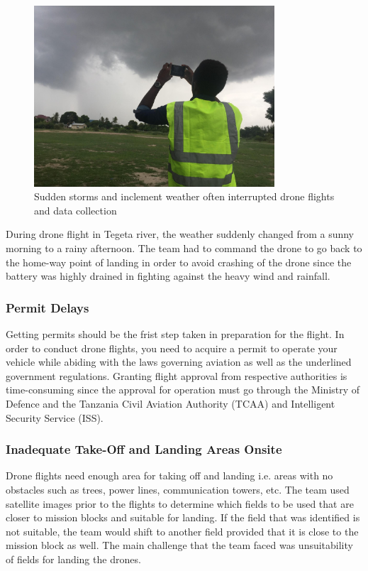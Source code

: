 \documentclass[a4paper,12pt,twoside]{article}
\begin{document}
        \begin{figure} %
            \centering
            \includegraphics[width=0.8\textwidth]{images/image9.jpg}
            \caption{Sudden storms and inclement weather often interrupted drone flights and data collection}
        \end{figure}
        
        During drone flight in Tegeta river, the weather suddenly changed from a sunny morning to a rainy afternoon. The team had to command the drone to go back to the home-way point of landing in order to avoid crashing of the drone since the battery was highly drained in fighting against the heavy wind and rainfall.
    
    \subsubsection{Permit Delays}
        Getting permits should be the frist step taken in preparation for the flight. In order to conduct drone flights, you need to acquire a permit to operate your vehicle while abiding with the laws governing aviation as well as the underlined government regulations.  Granting flight approval from respective authorities is time-consuming since the approval for operation must go through the Ministry of Defence and the Tanzania Civil Aviation Authority (TCAA) and Intelligent Security Service (ISS).
     
     \subsubsection{Inadequate Take-Off and Landing Areas Onsite}
         Drone flights need enough area for taking off and landing i.e. areas with no obstacles such as trees, power lines, communication towers, etc. The team used satellite images prior to the flights to determine which fields to be used that are closer to mission blocks and suitable for landing. If the field that was identified is not suitable, the team would shift to another field provided that it is close to the mission block as well. The main challenge that the team faced was unsuitability of fields for landing the drones.
     
\end{document}
